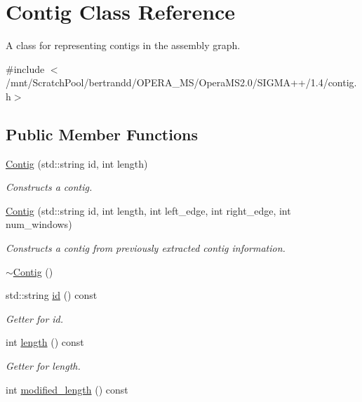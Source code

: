 \hypertarget{classContig}{
\section{Contig Class Reference}
\label{classContig}
}


A class for representing contigs in the assembly graph.  


{\ttfamily \#include $<$/mnt/ScratchPool/bertrandd/OPERA\_\-MS/OperaMS2.0/SIGMA++/1.4/contig.h$>$}\subsection*{Public Member Functions}
\begin{DoxyCompactItemize}
\item 
\hyperlink{classContig_abe1938f8abac2eed8350479b0ab2990d}{Contig} (std::string id, int length)
\begin{DoxyCompactList}\small\item\em Constructs a contig. \item\end{DoxyCompactList}\item 
\hyperlink{classContig_a56e3c05b8d1bba09b873df68ea119873}{Contig} (std::string id, int length, int left\_\-edge, int right\_\-edge, int num\_\-windows)
\begin{DoxyCompactList}\small\item\em Constructs a contig from previously extracted contig information. \item\end{DoxyCompactList}\item 
\hyperlink{classContig_a1e51c10e7db2939f1dc600ca20ec5e2b}{$\sim$Contig} ()
\item 
std::string \hyperlink{classContig_a01b2b4e2acbc8157c4a2e17e837a5805}{id} () const 
\begin{DoxyCompactList}\small\item\em Getter for id. \item\end{DoxyCompactList}\item 
int \hyperlink{classContig_a71da417bc339dbb8e9b13990c2cbb871}{length} () const 
\begin{DoxyCompactList}\small\item\em Getter for length. \item\end{DoxyCompactList}\item 
int \hyperlink{classContig_a578d98d1d77ae2f994b07cfc0db62779}{modified\_\-length} () const 

\end{DoxyCompactItemize}
